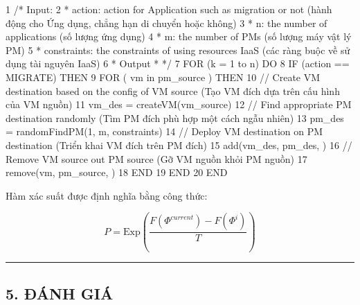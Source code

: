 \documentclass[
  vietnamese,
]{article}
\newenvironment{Shaded}{}{}
\newcommand{\NormalTok}[1]{#1}
\begin{document}
\begin{Shaded}
\begin{Highlighting}[]
\NormalTok{1   /* Input:}
\NormalTok{2    * action: action for Application such as migration or not}
\NormalTok{               (hành động cho Ứng dụng, chẳng hạn di chuyển hoặc không)}
\NormalTok{3    * n: the number of applications (số lượng ứng dụng)}
\NormalTok{4    * m: the number of PMs (số lượng máy vật lý PM)}
\NormalTok{5    * constraints: the constraints of using resources IaaS}
\NormalTok{                    (các ràng buộc về sử dụng tài nguyên IaaS)}
\NormalTok{6    * Output *           */}
\NormalTok{7   FOR (k = 1 to n) DO}
\NormalTok{8       IF (action == MIGRATE) THEN}
\NormalTok{9           FOR ( vm in pm\_source ) THEN}
\NormalTok{10              // Create VM destination based on the config of VM source}
\NormalTok{                   (Tạo VM đích dựa trên cấu hình của VM nguồn)}
\NormalTok{11              vm\_des = createVM(vm\_source)}
\NormalTok{12              // Find appropriate PM destination randomly}
\NormalTok{                   (Tìm PM đích phù hợp một cách ngẫu nhiên)}
\NormalTok{13              pm\_des = randomFindPM(1, m, constraints)}
\NormalTok{14              // Deploy VM destination on PM destination}
\NormalTok{                   (Triển khai VM đích trên PM đích)}
\NormalTok{15              add(vm\_des, pm\_des, )}
\NormalTok{16              // Remove VM source out PM source}
\NormalTok{                   (Gỡ VM nguồn khỏi PM nguồn)}
\NormalTok{17              remove(vm, pm\_source, )}
\NormalTok{18          END}
\NormalTok{19      END}
\NormalTok{20  END}
\end{Highlighting}
\end{Shaded}

Hàm xác suất được định nghĩa bằng công thức:

\[P = \text{Exp}\left( \frac{F(\Phi^{current}) - F(\Phi^{i})}{T} \right) \tag{20}\]

\begin{center}\rule{0.5\linewidth}{0.5pt}\end{center}

\subsection{5. ĐÁNH GIÁ}\label{ux111uxe1nh-giuxe1}
\end{document}
